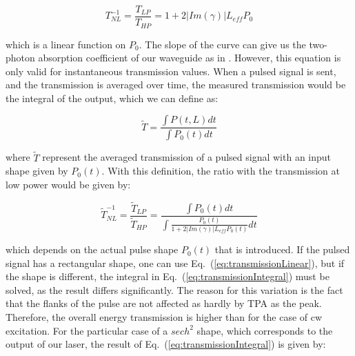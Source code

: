\begin{equation}
 T_{NL}^{-1} = \frac{T_{LP}}{T_{HP}} = 1+2|Im(\gamma)| L_{eff} P_0
\label{eq:transmissionLinear}
\end{equation}

which is a linear function on $P_0$.
The slope of the curve can give us the two-photon absorption coefficient of our waveguide as in \cite{Vallaitis2009}.
However, this equation is only valid for instantaneous transmission values.
When a pulsed signal is sent, and the transmission is averaged over time, the measured transmission would be the integral of the output, which we can define as:


\begin{equation}
 \tilde{T}  = \frac{\int P(t,L)dt}{\int P_0(t)dt}
\end{equation}

where $\tilde{T}$ represent the averaged transmission of a pulsed signal with an input shape given by $P_0(t)$. With this definition, the ratio with the transmission at low power would be given by:



\begin{equation}
\tilde{T}_{NL}^{-1} = \frac{\tilde{T}_{LP}}{\tilde{T}_{HP}} = \frac{\int P_0(t)dt}{\int \frac{P_0(t)}{1+2|Im(\gamma)| L_{eff} P_0(t)} dt}
\label{eq:transmissionIntegral}
\end{equation}


which depends on the actual pulse shape $P_{0}(t)$ that is introduced. If the pulsed signal has a rectangular shape, one can use Eq.~(\ref{eq:transmissionLinear}), but if the shape is different, the integral in Eq.~(\ref{eq:transmissionIntegral}) must be solved, as the result differs significantly.
The reason for this variation is the fact that the flanks of the pulse are not affected as hardly by TPA as the peak. Therefore, the overall energy transmission is higher than for the case of cw excitation.
For the particular case of a $sech^2$ shape, which corresponds to the output of our laser, the result of  Eq.~(\ref{eq:transmissionIntegral}) is given by:

